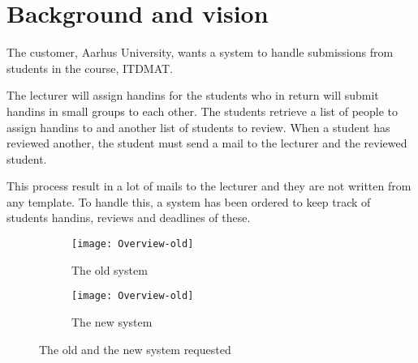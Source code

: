 \documentclass[Main]{subfiles}
\begin{document}
\section{Background and vision}
The customer, Aarhus University, wants a system to handle submissions from students in the course, ITDMAT.

The lecturer will assign handins for the students who in return will submit handins in small groups to each other.
The students retrieve a list of people to assign handins to and another list of students to review.
When a student has reviewed another, the student must send a mail to the lecturer and the reviewed student.

This process result in a lot of mails to the lecturer and they are not written from any template.
To handle this, a system has been ordered to keep track of students handins, reviews and deadlines of these.

\begin{figure}[H]
	\centering
	\begin{subfigure}[b]{0.50\textwidth}
		\texttt{[image: Overview-old]}
		\caption{The old system}
		\label{fig:overview-old}
	\end{subfigure}
	\begin{subfigure}[b]{0.50\textwidth}
		\texttt{[image: Overview-old]}
		\caption{The new system}
		\label{fig:overview-new}
	\end{subfigure}
	\caption{The old and the new system requested}\label{fig:overview}
\end{figure}
\end{document}
